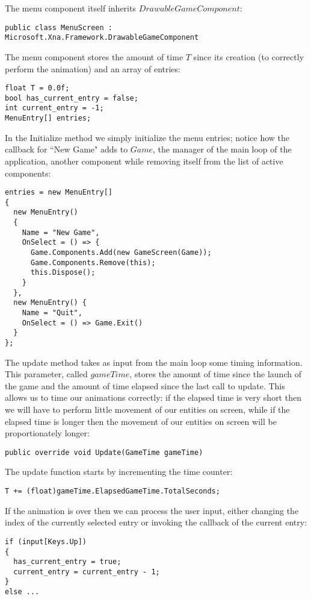 The menu component itself inherits $DrawableGameComponent$:
\begin{lstlisting}
public class MenuScreen : Microsoft.Xna.Framework.DrawableGameComponent
\end{lstlisting}

The menu component stores the amount of time $T$ since its creation (to correctly perform the animation) and an array of entries:
\begin{lstlisting}
float T = 0.0f;
bool has_current_entry = false;
int current_entry = -1;
MenuEntry[] entries;
\end{lstlisting}

In the Initialize method we simply initialize the menu entries; notice how the callback for ``New Game" adds to $Game$, the manager of the main loop of the application, another component while removing itself from the list of active components:
\begin{lstlisting}
entries = new MenuEntry[]
{
  new MenuEntry()
  {
    Name = "New Game",
    OnSelect = () => {
      Game.Components.Add(new GameScreen(Game));
      Game.Components.Remove(this);
      this.Dispose();
    }
  },
  new MenuEntry() {
    Name = "Quit",
    OnSelect = () => Game.Exit()
  }
};
\end{lstlisting}

The update method takes as input from the main loop some timing information. This parameter, called $gameTime$, stores the amount of time since the launch of the game and the amount of time elapsed since the last call to update. This allows us to time our animations correctly: if the elapsed time is very short then we will have to perform little movement of our entities on screen, while if the elapsed time is longer then the movement of our entities on screen will be proportionately longer:
\begin{lstlisting}
public override void Update(GameTime gameTime)
\end{lstlisting}

The update function starts by incrementing the time counter:
\begin{lstlisting}
T += (float)gameTime.ElapsedGameTime.TotalSeconds;
\end{lstlisting}

If the animation is over then we can process the user input, either changing the index of the currently selected entry or invoking the callback of the current entry:
\begin{lstlisting}
if (input[Keys.Up])
{
  has_current_entry = true;
  current_entry = current_entry - 1;
}
else ...
\end{lstlisting}

